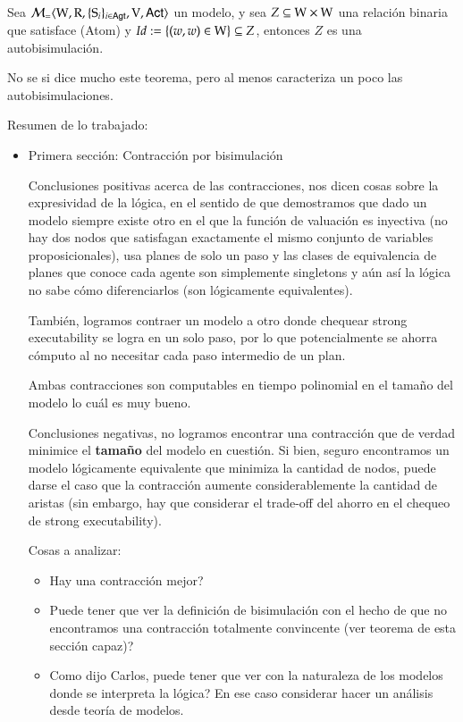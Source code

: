 \begin{teorema}
    Sea $\mathcal{M}_=\langle \mathrm{W},\mathrm{R},\{ \mathrm{S}_i \}_{i \in {\rm \sf Agt}},\mathrm{V},{\rm \sf Act} \rangle$ un modelo, y sea $Z \subseteq \mathrm{W} \times \mathrm{W}$ una relación binaria que satisface (Atom) y $Id := \{(w,w)\in \mathrm{W}\} \subseteq Z$, entonces $Z$ es una autobisimulación.
\end{teorema}

No se si dice mucho este teorema, pero al menos caracteriza un poco las autobisimulaciones.

Resumen de lo trabajado:

\begin{itemize}

\item Primera sección: Contracción por bisimulación

Conclusiones positivas acerca de las contracciones, nos dicen cosas sobre la expresividad de la lógica, en el sentido de que demostramos que dado un modelo siempre existe otro en el que la función de valuación es inyectiva (no hay dos nodos que satisfagan exactamente el mismo conjunto de variables proposicionales), usa planes de solo un paso y las clases de equivalencia de planes que conoce cada agente son simplemente singletons y aún así la lógica no sabe cómo diferenciarlos (son lógicamente equivalentes).

También, logramos contraer un modelo a otro donde chequear strong executability se logra en un solo paso, por lo que potencialmente se ahorra cómputo al no necesitar cada paso intermedio de un plan.

Ambas contracciones son computables en tiempo polinomial en el tamaño del modelo lo cuál es muy bueno.


Conclusiones negativas, no logramos encontrar una contracción que de verdad minimice el \rm\textbf{tamaño} del modelo en cuestión. Si bien, seguro encontramos un modelo lógicamente equivalente que minimiza la cantidad de nodos, puede darse el caso que la contracción aumente considerablemente la cantidad de aristas (sin embargo, hay que considerar el trade-off del ahorro en el chequeo de strong executability).

Cosas a analizar: 
\begin{itemize}
    \item Hay una contracción mejor?
    \item Puede tener que ver la definición de bisimulación con el hecho de que no encontramos una contracción totalmente convincente (ver teorema de esta sección capaz)? 
    \item Como dijo Carlos, puede tener que ver con la naturaleza de los modelos donde se interpreta la lógica? En ese caso considerar hacer un análisis desde teoría de modelos.
\end{itemize}



\end{itemize}
